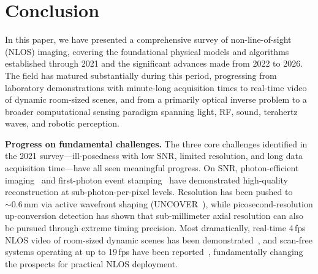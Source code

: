 \section{Conclusion} \label{sec6}
In this paper, we have presented a comprehensive survey of non-line-of-sight (NLOS) imaging, covering the foundational physical models and algorithms established through 2021 and the significant advances made from 2022 to 2026. The field has matured substantially during this period, progressing from laboratory demonstrations with minute-long acquisition times to real-time video of dynamic room-sized scenes, and from a primarily optical inverse problem to a broader computational sensing paradigm spanning light, RF, sound, terahertz waves, and robotic perception.

\textbf{Progress on fundamental challenges.}
The three core challenges identified in the 2021 survey---ill-posedness with low SNR, limited resolution, and long data acquisition time---have all seen meaningful progress. On SNR, photon-efficient imaging~\cite{liuPhotonEfficientNLOS2022} and first-photon event stamping~\cite{liFastFirstPhoton2022} have demonstrated high-quality reconstruction at sub-photon-per-pixel levels. Resolution has been pushed to $\sim0.6\,\text{mm}$ via active wavefront shaping (UNCOVER~\cite{caohighresolutionnlos2022}), while picosecond-resolution up-conversion detection has shown that sub-millimeter axial resolution can also be pursued through extreme timing precision. Most dramatically, real-time 4\,fps NLOS video of room-sized dynamic scenes has been demonstrated~\cite{yeRealTimeNLOS2024}, and scan-free systems operating at up to 19\,fps have been reported~\cite{zhangRealTimeScanFree2024}, fundamentally changing the prospects for practical NLOS deployment.

